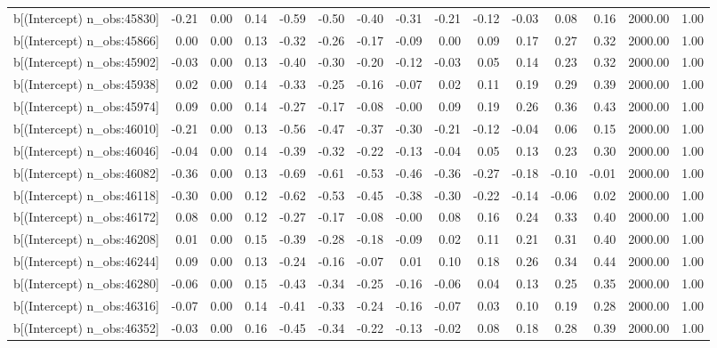 \begin{table}[ht]
\begin{tabular}{rrrrrrrrrrrrrrr}
  b[(Intercept) n\_obs:45830] & -0.21 & 0.00 & 0.14 & -0.59 & -0.50 & -0.40 & -0.31 & -0.21 & -0.12 & -0.03 & 0.08 & 0.16 & 2000.00 & 1.00 \\ 
  b[(Intercept) n\_obs:45866] & 0.00 & 0.00 & 0.13 & -0.32 & -0.26 & -0.17 & -0.09 & 0.00 & 0.09 & 0.17 & 0.27 & 0.32 & 2000.00 & 1.00 \\ 
  b[(Intercept) n\_obs:45902] & -0.03 & 0.00 & 0.13 & -0.40 & -0.30 & -0.20 & -0.12 & -0.03 & 0.05 & 0.14 & 0.23 & 0.32 & 2000.00 & 1.00 \\ 
  b[(Intercept) n\_obs:45938] & 0.02 & 0.00 & 0.14 & -0.33 & -0.25 & -0.16 & -0.07 & 0.02 & 0.11 & 0.19 & 0.29 & 0.39 & 2000.00 & 1.00 \\ 
  b[(Intercept) n\_obs:45974] & 0.09 & 0.00 & 0.14 & -0.27 & -0.17 & -0.08 & -0.00 & 0.09 & 0.19 & 0.26 & 0.36 & 0.43 & 2000.00 & 1.00 \\ 
  b[(Intercept) n\_obs:46010] & -0.21 & 0.00 & 0.13 & -0.56 & -0.47 & -0.37 & -0.30 & -0.21 & -0.12 & -0.04 & 0.06 & 0.15 & 2000.00 & 1.00 \\ 
  b[(Intercept) n\_obs:46046] & -0.04 & 0.00 & 0.14 & -0.39 & -0.32 & -0.22 & -0.13 & -0.04 & 0.05 & 0.13 & 0.23 & 0.30 & 2000.00 & 1.00 \\ 
  b[(Intercept) n\_obs:46082] & -0.36 & 0.00 & 0.13 & -0.69 & -0.61 & -0.53 & -0.46 & -0.36 & -0.27 & -0.18 & -0.10 & -0.01 & 2000.00 & 1.00 \\ 
  b[(Intercept) n\_obs:46118] & -0.30 & 0.00 & 0.12 & -0.62 & -0.53 & -0.45 & -0.38 & -0.30 & -0.22 & -0.14 & -0.06 & 0.02 & 2000.00 & 1.00 \\ 
  b[(Intercept) n\_obs:46172] & 0.08 & 0.00 & 0.12 & -0.27 & -0.17 & -0.08 & -0.00 & 0.08 & 0.16 & 0.24 & 0.33 & 0.40 & 2000.00 & 1.00 \\ 
  b[(Intercept) n\_obs:46208] & 0.01 & 0.00 & 0.15 & -0.39 & -0.28 & -0.18 & -0.09 & 0.02 & 0.11 & 0.21 & 0.31 & 0.40 & 2000.00 & 1.00 \\ 
  b[(Intercept) n\_obs:46244] & 0.09 & 0.00 & 0.13 & -0.24 & -0.16 & -0.07 & 0.01 & 0.10 & 0.18 & 0.26 & 0.34 & 0.44 & 2000.00 & 1.00 \\ 
  b[(Intercept) n\_obs:46280] & -0.06 & 0.00 & 0.15 & -0.43 & -0.34 & -0.25 & -0.16 & -0.06 & 0.04 & 0.13 & 0.25 & 0.35 & 2000.00 & 1.00 \\ 
  b[(Intercept) n\_obs:46316] & -0.07 & 0.00 & 0.14 & -0.41 & -0.33 & -0.24 & -0.16 & -0.07 & 0.03 & 0.10 & 0.19 & 0.28 & 2000.00 & 1.00 \\ 
  b[(Intercept) n\_obs:46352] & -0.03 & 0.00 & 0.16 & -0.45 & -0.34 & -0.22 & -0.13 & -0.02 & 0.08 & 0.18 & 0.28 & 0.39 & 2000.00 & 1.00 \\ 

\end{tabular}
\end{table}
